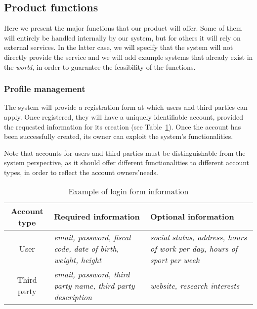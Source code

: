   \subsection{Product functions}

    Here we present the major functions that our product will offer. Some of them will entirely be handled internally by our system, but for others it will rely on external services. In the latter case, we will specify that the system will not directly provide the service and we will add example systems that already exist in the \textit{world}, in order to guarantee the feasibility of the functions.

    \subsubsection{Profile management}

      The system will provide a registration form at which users and third parties can apply. Once registered, they will have a uniquely identifiable account, provided the requested information for its creation (see Table~\ref{tab:login}). Once the account has been successfully created, its owner can exploit the system's functionalities.

      Note that accounts for users and third parties must be distinguishable from the system perspective, as it should offer different functionalities to different account types, in order to reflect the account owners'needs.

      \begin{table}[h!]
        \centering
        \begin{tabularx}{\linewidth}{|c|X|X|}
          \hline
          \textbf{Account type} & \textbf{Required information}                                       & \textbf{Optional information}                                                   \\ \hline
          User                  & \textit{email, password, fiscal code, date of birth, weight, height}             & \textit{social status, address, hours of work per day, hours of sport per week} \\ \hline
          Third party           & \textit{email, password, third party name, third party description} & \textit{website, research interests}                                            \\ \hline
        \end{tabularx}
        \caption{Example of login form information}
        \label{tab:login}
      \end{table}

